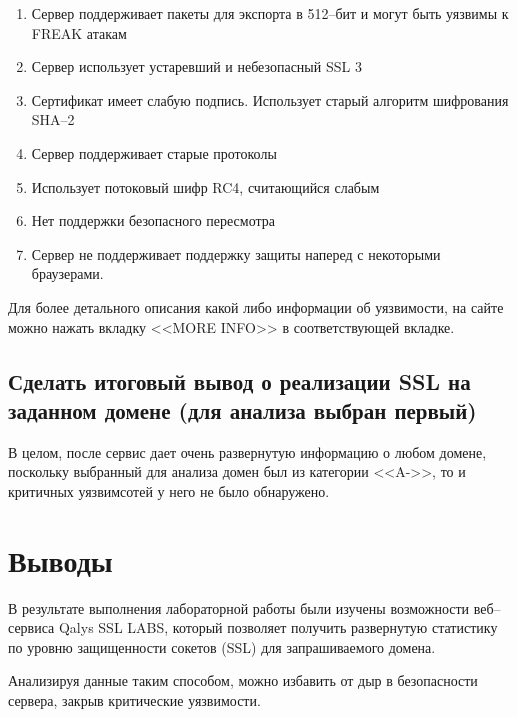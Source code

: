 \documentclass[utf8x, 12pt]{G7-32}
\begin{document}
\begin{enumerate}
	\item Сервер поддерживает пакеты для экспорта в 512--бит и могут быть уязвимы к FREAK атакам
	\item  Сервер использует устаревший и небезопасный SSL 3 
	\item Сертификат имеет слабую подпись. Использует старый алгоритм шифрования SHA--2
	\item Сервер поддерживает старые протоколы
	\item Использует потоковый шифр RC4, считающийся слабым
	\item Нет поддержки безопасного пересмотра
	\item Сервер не поддерживает поддержку защиты наперед с некоторыми браузерами.
\end{enumerate}

Для более детального описания какой либо информации об уязвимости, на сайте можно нажать вкладку <<MORE INFO>> в соответствующей вкладке.




\section{Сделать итоговый вывод о реализации SSL на заданном домене (для анализа выбран первый)}

В целом, после сервис дает очень развернутую информацию о любом домене, поскольку выбранный для анализа домен был из категории <<A->>, то и критичных уязвимсотей у него не было обнаружено.



\chapter{Выводы}
	В результате выполнения лабораторной работы были изучены возможности веб--сервиса Qalys SSL LABS, который позволяет получить развернутую статистику по уровню защищенности сокетов (SSL) для запрашиваемого домена. 

	Анализируя данные таким способом, можно избавить от дыр в безопасности сервера, закрыв критические уязвимости.
\end{document}
